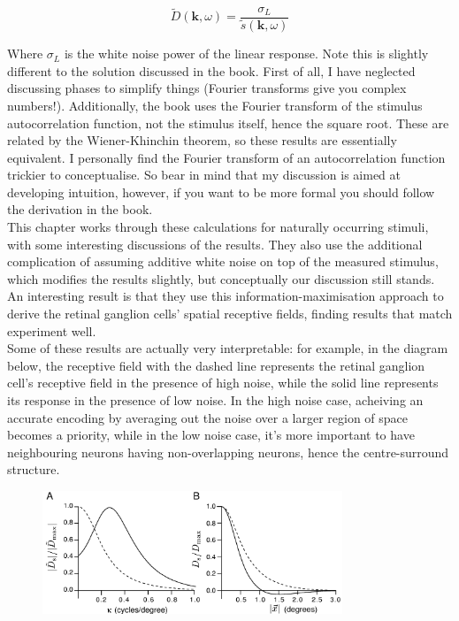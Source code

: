 \documentclass{article}
\begin{document}
\begin{equation*}
    \tilde{D}(\bm{k},\omega)=\frac{\sigma_L}{\tilde{s}(\bm{k},\omega)}
\end{equation*}

Where $\sigma_L$ is the white noise power of the linear response. Note this is slightly different to the solution discussed in the book. First of all, I have neglected discussing phases to simplify things (Fourier transforms give you complex numbers!). Additionally, the book uses the Fourier transform of the stimulus autocorrelation function, not the stimulus itself, hence the square root. These are related by the Wiener-Khinchin theorem, so these results are essentially equivalent. I personally find the Fourier transform of an autocorrelation function trickier to conceptualise. So bear in mind that my discussion is aimed at developing intuition, however, if you want to be more formal you should follow the derivation in the book.\\

This chapter works through these calculations for naturally occurring stimuli, with some interesting discussions of the results. They also use the additional complication of assuming additive white noise on top of the measured stimulus, which modifies the results slightly, but conceptually our discussion still stands. An interesting result is that they use this information-maximisation approach to derive the retinal ganglion cells' spatial receptive fields, finding results that match experiment well.\\

Some of these results are actually very interpretable: for example, in the diagram below, the receptive field with the dashed line represents the retinal ganglion cell's receptive field in the presence of high noise, while the solid line represents its response in the presence of low noise. In the high noise case, acheiving an accurate encoding by averaging out the noise over a larger region of space becomes a priority, while in the low noise case, it's more important to have neighbouring neurons having non-overlapping neurons, hence the centre-surround structure.

\begin{figure}[H]
    \centering
    \includegraphics[width=0.8\textwidth]{receptive.png}
\end{figure}
\end{document}
